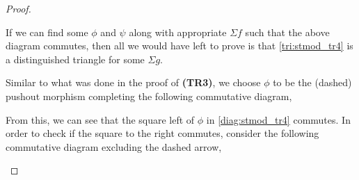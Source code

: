 \begin{proof}
\begin{enumerate}[label={(\bfseries TR\arabic*)}]
{\begin{diagramlabel}[\label{diag:stmod_tr4}]
            \end{diagramlabel}

            If we can find some \( \phi \) and \( \psi \) along with appropriate \( \Sigma f \) such that the above diagram commutes, then all we would have left to prove is that \autoref{tri:stmod_tr4} is a distinguished triangle for some \( \Sigma g \).

            Similar to what was done in the proof of {\bf (TR3)}, we choose \( \phi \) to be the (dashed) pushout morphism completing the following commutative diagram,
            \begin{center}
            \end{center}
            From this, we can see that the square left of \( \phi \) in \autoref{diag:stmod_tr4} commutes. In order to check if the square to the right commutes, consider the following commutative diagram excluding the dashed arrow,
            \begin{center}
\end{center}}
\end{enumerate}
\end{proof}
